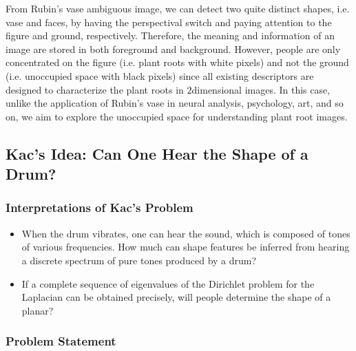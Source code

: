 From Rubin's vase ambiguous image, we can detect two quite distinct
shapes, i.e. vase and faces, by having the perspectival switch and
paying attention to the figure and ground, respectively. Therefore,
the meaning and information of an image are stored in both foreground
and background. However, people are only concentrated on the figure
(i.e. plant roots with white pixels) and not the ground
(i.e. unoccupied space with black pixels) since all existing
descriptors are designed to characterize the plant roots in $2
$dimensional images. In this case, unlike the application of Rubin's
vase in neural analysis, psychology, art, and so on, we aim to explore
the unoccupied space for understanding plant root images.




\subsection{Kac’s Idea: Can One Hear the Shape of a Drum? \cite{kac1966can}}



  \subsubsection{Interpretations of Kac's Problem}

     \begin{itemize}
       \item When the drum vibrates, one can hear the sound, which is composed of tones of various frequencies. How much can shape features be inferred from hearing a discrete spectrum of pure tones produced by a drum?
       \item If a complete sequence of eigenvalues of the Dirichlet problem for the Laplacian can be obtained precisely, will people determine the shape of a planar?
     \end{itemize}




    \subsubsection{Problem Statement}

